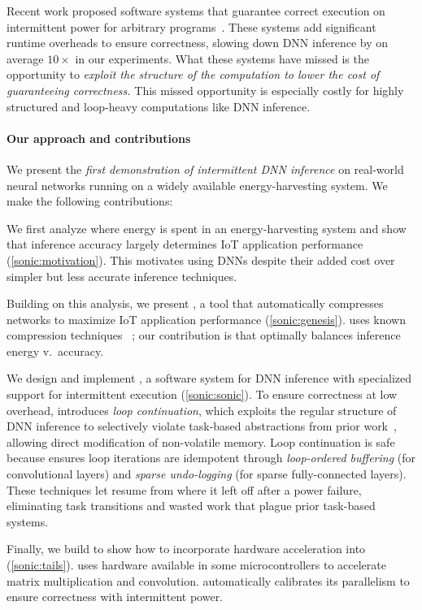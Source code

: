 Recent work proposed software systems that guarantee correct
execution on intermittent power for arbitrary
programs~\cite{dino,ratchet,clank,chain,alpaca,mayfly}.
%
These systems add significant runtime overheads to ensure correctness,
slowing down DNN inference by on average $10\times$ in our experiments.
%
What these systems have missed is the opportunity to \emph{exploit the
  structure of the computation to lower the cost of guaranteeing correctness.}
%
This missed opportunity is especially costly for highly structured and
loop-heavy computations like DNN inference.

\paragraph{Our approach and contributions}
%
We present the \emph{first demonstration of intermittent DNN
inference} on real-world neural networks running on a widely
available energy-harvesting system.
%
We make the following contributions:

\begin{compactitem}
\item We first analyze where energy is spent in an energy-harvesting system
and show that inference accuracy largely determines IoT
application performance (\autoref{sonic:motivation}).
%
This motivates using DNNs despite their added cost over simpler but
less accurate inference techniques.
%
\item Building on this analysis, we present \genesis, a tool that
automatically compresses networks to maximize IoT application
performance (\autoref{sonic:genesis}).
%
\genesis uses known compression techniques%
~\cite{nabhan1994toward, han:iclr16:deep-compression,
  chollet2016xception, bhattacharya2016sparsification};
%
our contribution is that \genesis optimally balances inference energy
v.\ accuracy. %
%
\item We design and implement \sonic, 
  a software system for DNN inference with specialized support for intermittent execution
  (\autoref{sonic:sonic}).
  To ensure correctness at low overhead,
  \sonic introduces \emph{loop continuation},
  which exploits the regular structure of DNN inference
  to selectively violate task-based abstractions from prior work~\cite{alpaca},
  allowing direct modification of non-volatile memory.
%
  Loop continuation is safe because
  \sonic ensures loop iterations are idempotent
  through \emph{loop-ordered buffering} (for convolutional layers) and \emph{sparse undo-logging} (for sparse fully-connected layers).
%
These techniques let \sonic resume from where it left off after a power failure,
{eliminating task transitions and wasted work} that plague prior task-based systems.
%
\item Finally, we build \tails to show how to incorporate hardware
  acceleration into \sonic (\autoref{sonic:tails}). \tails uses
  hardware available in some microcontrollers to accelerate matrix
  multiplication and convolution.
  \tails automatically calibrates its parallelism
  to ensure correctness with intermittent power.

\end{compactitem}

